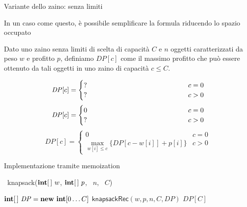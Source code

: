 \begin{frame}{Variante dello zaino: senza limiti}

\vspace{-9pt}
\begin{myboxtitle}
In un caso come questo, è possibile semplificare la formula riducendo
lo spazio occupato
\end{myboxtitle}

\begin{myboxtitle}
Dato uno zaino senza limiti di scelta di capacità $C$ e $n$ oggetti caratterizzati
da peso $w$ e profitto $p$, definiamo $\mathit{DP}[c]$ come il
massimo profitto che può essere ottenuto da tali oggetti
in uno zaino di capacità $c \leq  C$.
\end{myboxtitle}

\begin{overprint}
\[
\mathit{DP}[c] = \begin{cases}
  \makebox[5cm][l]{?} & c=0 \\
  \makebox[5cm][l]{?} & c>0
\end{cases}
\]
\[
\mathit{DP}[c] = \begin{cases}
  0 & c=0 \\
  \makebox[5cm][l]{?} & c>0
\end{cases}
\]
\[
\mathit{DP}[c] = \begin{cases}
  0 & c=0 \\
  \max_{w[i] \leq c} \{ \mathit{DP}[c-w[i]]+p[i] \} & c>0
\end{cases}
\]
\end{overprint}

\end{frame}

\begin{frame}{Implementazione tramite memoization}

\vspace{-9pt}
\begin{Procedure}
\caption[A]{\INTEGER\ \textsf{knapsack}($\INTEGER[\,]\ w$, $\INTEGER[\,]\ p$, \INTEGER\ $n$, \INTEGER\ $C$)}
  $\INTEGER[\,]\ \mathit{DP} = \NEW\ \INTEGER[0 \ldots C]$\;
  $\textsf{knapsackRec}(w, p, n, C, \mathit{DP})$\;
  \Return $\mathit{DP}[C]$\;
\end{Procedure}
\end{frame}
  
